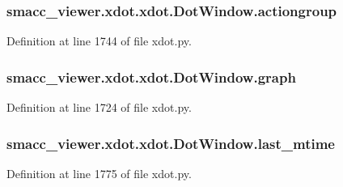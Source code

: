 \subsubsection[{\texorpdfstring{actiongroup}{actiongroup}}]{\setlength{\rightskip}{0pt plus 5cm}smacc\+\_\+viewer.\+xdot.\+xdot.\+Dot\+Window.\+actiongroup}\hypertarget{classsmacc__viewer_1_1xdot_1_1xdot_1_1DotWindow_a3e2e5fc8cc3f87f2515e6bca81e9d018}{}\label{classsmacc__viewer_1_1xdot_1_1xdot_1_1DotWindow_a3e2e5fc8cc3f87f2515e6bca81e9d018}


Definition at line 1744 of file xdot.\+py.

\subsubsection[{\texorpdfstring{graph}{graph}}]{\setlength{\rightskip}{0pt plus 5cm}smacc\+\_\+viewer.\+xdot.\+xdot.\+Dot\+Window.\+graph}\hypertarget{classsmacc__viewer_1_1xdot_1_1xdot_1_1DotWindow_abc3c11e74308a0c1b3011b5c008e0df6}{}\label{classsmacc__viewer_1_1xdot_1_1xdot_1_1DotWindow_abc3c11e74308a0c1b3011b5c008e0df6}


Definition at line 1724 of file xdot.\+py.

\subsubsection[{\texorpdfstring{last\+\_\+mtime}{last_mtime}}]{\setlength{\rightskip}{0pt plus 5cm}smacc\+\_\+viewer.\+xdot.\+xdot.\+Dot\+Window.\+last\+\_\+mtime}\hypertarget{classsmacc__viewer_1_1xdot_1_1xdot_1_1DotWindow_a9c07c47acc6f1125c1c5fe95ed2ffbce}{}\label{classsmacc__viewer_1_1xdot_1_1xdot_1_1DotWindow_a9c07c47acc6f1125c1c5fe95ed2ffbce}


Definition at line 1775 of file xdot.\+py.

